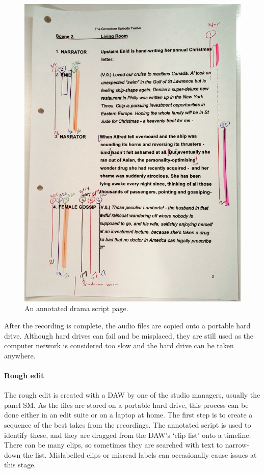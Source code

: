 \begin{figure}[p]
  \centering
  \includegraphics[width=\columnwidth]{figs/drama-script-example-processed.jpg}
  \caption{An annotated drama script page.}
  \label{fig:drama-script}
\end{figure}

After the recording is complete, the audio files are copied onto a portable hard drive. Although hard drives can fail
and be misplaced, they are still used as the computer network is considered too slow and the hard drive can be taken
anywhere.

\paragraph{Rough edit}
The rough edit is created with a DAW by one of the studio managers, usually the panel SM. As the files are stored on a
portable hard drive, this process can be done either in an edit suite or on a laptop at home. The first step is to
create a sequence of the best takes from the recordings. The annotated script is used to identify these, and they are
dragged from the DAW's `clip list' onto a timeline. There can be many clips, so sometimes they are searched with text
to narrow-down the list. Mislabelled clips or misread labels can occasionally cause issues at this stage.

